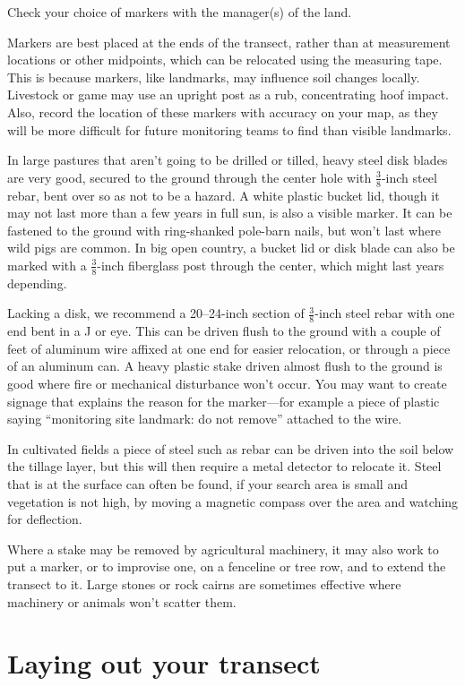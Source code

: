 \documentclass[11pt,letterpaper,twoside,onecolumn]{memoir}
\begin{document}
Check your choice of markers with the manager(s) of the land. 

Markers are best placed at the ends of the transect, rather than at measurement locations or other midpoints, which can be relocated using the measuring tape. This is because markers, like landmarks, may influence soil changes locally. Livestock or game may use an upright post as a rub, concentrating hoof impact. Also, record the location of these markers with accuracy on your map, as they will be more difficult for future monitoring teams to find than visible landmarks.

In large pastures that aren't going to be drilled or tilled, heavy steel disk blades are very good, secured to the ground through the center hole with $\frac{3}{8}$-inch steel rebar, bent over so as not to be a hazard. A white plastic bucket lid, though it may not last more than a few years in full sun, is also a visible marker. It can be fastened to the ground with ring-shanked pole-barn nails, but won't last where wild pigs are common. In big open country, a bucket lid or disk blade can also be marked with a $\frac{3}{8}$-inch fiberglass post through the center, which might last years depending. 

Lacking a disk, we recommend a 20--24-inch section of $\frac{3}{8}$-inch steel rebar with one end bent in a J or eye. This can be driven flush to the ground with a couple of feet of aluminum wire affixed at one end for easier relocation, or through a piece of an aluminum can. A heavy plastic stake driven almost flush to the ground is good where fire or mechanical disturbance won't occur. You may want to create signage that explains the reason for the marker---for example a piece of plastic saying ``monitoring site landmark: do not remove'' attached to the wire. 

In cultivated fields a piece of steel such as rebar can be driven into the soil below the tillage layer, but this will then require a metal detector to relocate it. Steel that is at the surface can often be found, if your search area is small and vegetation is not high, by moving a magnetic compass over the area and watching for deflection.

Where a stake may be removed by agricultural machinery, it may also work to put a marker, or to improvise one, on a fenceline or tree row, and to extend the transect to it. Large stones or rock cairns are sometimes effective where machinery or animals won't scatter them.

\section*{Laying out your transect}
\end{document}
